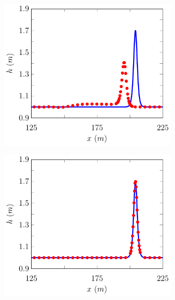 \begin{figure}
	\centering
	\begin{subfigure}{0.5\textwidth}
		\includegraphics[width=\textwidth]{./chp5/figures/Analytic/Soliton/Example/FDVM1.pdf}
		\vspace{0.5cm}
	\end{subfigure}%
	\begin{subfigure}{0.5\textwidth}
		\includegraphics[width=\textwidth]{./chp5/figures/Analytic/Soliton/Example/FDVM2.pdf}

\end{subfigure}
\end{figure}
